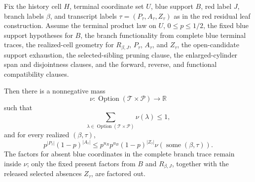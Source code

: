 \begin{helper}
Fix the history cell \(H\), terminal coordinate set \(U\), blue support
\(B\), red label \(J\), branch labels \(\beta\), and transcript labels
\(\tau=(P_\tau,A_\tau,Z_\tau)\) as in the red residual leaf construction.
Assume the terminal product law on \(U\), \(0\le p\le 1/2\), the fixed blue
support hypotheses for \(B\), the branch functionality from complete blue
terminal traces, the realized-cell geometry for \(R_{\beta,J}\), \(P_\tau\),
\(A_\tau\), and \(Z_\tau\), the open-candidate support exhaustion, the
selected-sibling pruning clause, the enlarged-cylinder span and disjointness
clauses, and the forward, reverse, and functional compatibility clauses.

Then there is a nonnegative mass
\[
\nu:\operatorname{Option}(\mathcal T\times\mathcal P)\to\mathbb R
\]
such that
\[
\sum_{\lambda\in \operatorname{Option}(\mathcal T\times\mathcal P)}
  \nu(\lambda)\le 1,
\]
and for every realized \((\beta,\tau)\),
\[
p^{|P_\tau|}(1-p)^{|A_\tau|}
\le
p^{u_R}p^{u_B}(1-p)^{|Z_\tau|}\nu(\operatorname{some}(\beta,\tau)).
\]
The factors for absent blue coordinates in the complete branch trace remain
inside \(\nu\); only the fixed present factors from \(B\) and
\(R_{\beta,J}\), together with the released selected absences \(Z_\tau\), are
factored out.
\end{helper}
